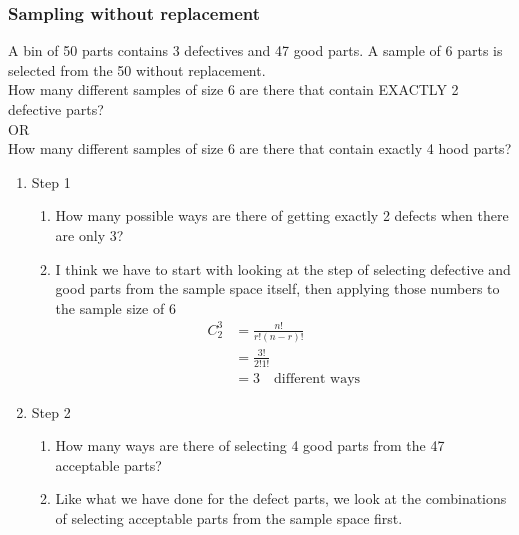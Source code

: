 \documentclass[../INDE315.tex]{subfiles}
\begin{document}
\subsubsection*{Sampling without replacement}
\begin{exmp}
    A bin of 50 parts contains 3 defectives and 47 good parts. A sample of 6 parts is selected from the 50 without replacement. \\
    How many different samples of size 6 are there that contain EXACTLY 2 defective parts? \\
    OR \\
    How many different samples of size 6 are there that contain exactly 4 hood parts?
\end{exmp}
\begin{enumerate}
    \item Step 1
        \begin{enumerate}
            \item How many possible ways are there of getting exactly 2 defects when there are only 3?
            \item I think we have to start with looking at the step of selecting defective and good parts from the sample space itself, then applying those numbers to the sample size of 6
                \begin{equation*}
                    \begin{aligned}
                        C^3_2 &= \frac{n!}{r!(n-r)!} \\
                                &= \frac{3!}{2!1!} \\
                                &= 3 \quad \text{different ways}
                    \end{aligned}
                \end{equation*}
        \end{enumerate}
    \item Step 2
        \begin{enumerate}
            \item How many ways are there of selecting 4 good parts from the 47 acceptable parts?
            \item Like what we have done for the defect parts, we look at the combinations of selecting acceptable parts from the sample space first.
                \begin{equation*}

\end{equation*}
\end{enumerate}
\end{enumerate}
\end{document}
